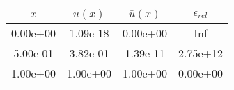 \begin{tabular}{|c|c|c|c|}
\hline
\textbf{$x$}&\textbf{$u(x)$}&\textbf{$\bar{u}(x)$}&\textbf{$\epsilon_{rel}$}\\\hline
0.00e+00&1.09e-18&0.00e+00&Inf\\\hline
5.00e-01&3.82e-01&1.39e-11&2.75e+12\\\hline
1.00e+00&1.00e+00&1.00e+00&0.00e+00\\\hline
\end{tabular}
